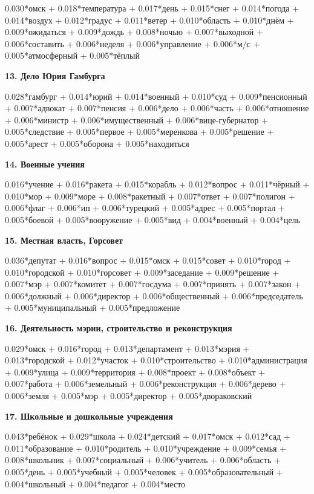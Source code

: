 0.030*омск + 0.018*температура + 0.017*день + 0.015*снег + 0.014*погода + 0.014*воздух + 0.012*градус + 0.011*ветер + 0.010*область + 0.010*днём + 0.009*ожидаться + 0.009*дождь + 0.008*ночью + 0.007*выходной + 0.006*составить + 0.006*неделя + 0.006*управление + 0.006*м/с + 0.005*атмосферный + 0.005*тёплый

\textbf{13. Дело Юрия Гамбурга\footnotemark}

0.028*гамбург + 0.014*юрий + 0.014*военный + 0.010*суд + 0.009*пенсионный + 0.007*адвокат + 0.007*пенсия + 0.006*дело + 0.006*часть + 0.006*отношение + 0.006*министр + 0.006*имущественный + 0.006*вице-губернатор + 0.005*следствие + 0.005*первое + 0.005*меренкова + 0.005*решение + 0.005*арест + 0.005*оборона + 0.005*находиться

\textbf{14. Военные учения}

0.016*учение + 0.016*ракета + 0.015*корабль + 0.012*вопрос + 0.011*чёрный + 0.010*мор + 0.009*море + 0.008*ракетный + 0.007*ответ + 0.007*полигон + 0.006*флаг + 0.006*ип + 0.006*турецкий + 0.005*адрес + 0.005*портал + 0.005*боевой + 0.005*вооружение + 0.005*вид + 0.004*военный + 0.004*цель

\textbf{15. Местная власть, Горсовет}

0.036*депутат + 0.016*вопрос + 0.015*омск + 0.015*совет + 0.010*город + 0.010*городской + 0.010*горсовет + 0.009*заседание + 0.009*решение + 0.007*мэр + 0.007*комитет + 0.007*госдума + 0.007*принять + 0.007*закон + 0.006*должный + 0.006*директор + 0.006*общественный + 0.006*председатель + 0.005*муниципальный + 0.005*предложение

\textbf{16. Деятельность мэрии, строительство и реконструкция}

0.029*омск + 0.016*город + 0.013*департамент + 0.013*мэрия + 0.013*городской + 0.012*участок + 0.010*строительство + 0.010*администрация + 0.009*улица + 0.009*территория + 0.008*проект + 0.008*объект + 0.007*работа + 0.006*земельный + 0.006*реконструкция + 0.006*дерево + 0.006*земля + 0.005*мэр + 0.005*директор + 0.005*двораковский

\textbf{17. Школьные и дошкольные учреждения}

0.043*ребёнок + 0.029*школа + 0.024*детский + 0.017*омск + 0.012*сад + 0.011*образование + 0.010*родитель + 0.010*учреждение + 0.009*семья + 0.008*школьник + 0.007*социальный + 0.006*учитель + 0.006*область + 0.005*день + 0.005*учебный + 0.005*человек + 0.005*образовательный + 0.004*школьный + 0.004*педагог + 0.004*место

